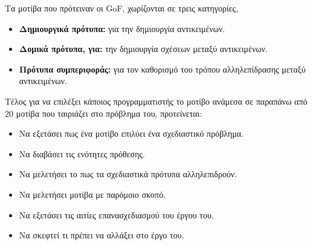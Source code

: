 \par
Τα μοτίβα που πρότειναν οι GoF, χωρίζονται σε τρεις κατηγορίες, 
\begin{itemize}
    \item \textbf{Δημιουργικά πρότυπα:} για την δημιουργία αντικειμένων.
    \item \textbf{Δομικά πρότυπα, για:} την δημιουργία σχέσεων μεταξύ αντικειμένων.
    \item \textbf{Πρότυπα συμπεριφοράς:} για τον καθορισμό του τρόπου αλληλεπίδρασης μεταξύ αντικειμένων.
\end{itemize}
\par
Τέλος για να επιλέξει κάποιος προγραμματιστής το μοτίβο ανάμεσα σε παραπάνω από 
20 μοτίβα που ταιριάζει στο πρόβλημα του, προτείνεται: 
\begin{itemize}
    \item Να εξετάσει πως ένα μοτίβο επιλύει ένα σχεδιαστικό πρόβλημα.
    \item Να διαβάσει τις ενότητες πρόθεσης.
    \item Να μελετήσει το πως τα σχεδιαστικά πρότυπα αλληλεπιδρούν.
    \item Να μελετήσει μοτίβα με παρόμοιο σκοπό.
    \item Να εξετάσει τις αιτίες επανασχεδιασμού του έργου του.
    \item Να σκεφτεί τι πρέπει να αλλάξει στο έργο του.
\end{itemize}
